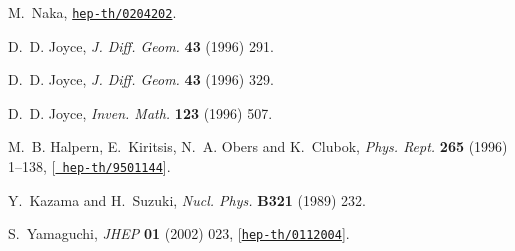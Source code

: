 \documentclass[a4paper,12pt]{article}
\numberwithin{equation}{section}
\begin{document}
\begin{thebibliography}{10}
M.~Naka, \href{http://xxx.lanl.gov/abs/hep-th/0204202}{{\tt hep-th/0204202}}.

D.~D. Joyce, {\em J. Diff. Geom.} {\bf 43} (1996) 291.

D.~D. Joyce, {\em J. Diff. Geom.} {\bf 43} (1996) 329.

D.~D. Joyce, {\em Inven. Math.} {\bf 123} (1996) 507.

M.~B. Halpern, E.~Kiritsis, N.~A. Obers and K.~Clubok, {\em Phys. Rept.} {\bf
  265} (1996) 1--138, [\href{http://xxx.lanl.gov/abs/hep-th/9501144}{{\tt
  hep-th/9501144}}].

Y.~Kazama and H.~Suzuki, {\em Nucl. Phys.} {\bf B321} (1989) 232.

S.~Yamaguchi, {\em JHEP} {\bf 01} (2002) 023,
  [\href{http://xxx.lanl.gov/abs/hep-th/0112004}{{\tt hep-th/0112004}}].

\end{thebibliography}\endgroup
\end{document}
